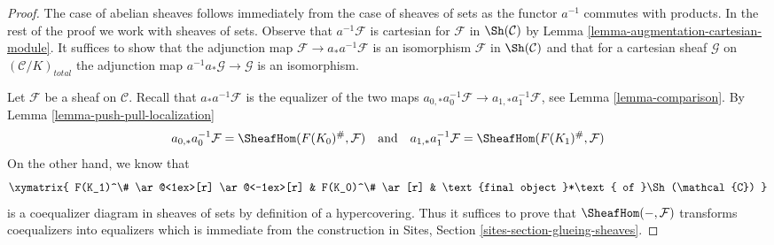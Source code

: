\begin{proof}
The case of abelian sheaves follows immediately from the case
of sheaves of sets as the functor $a^{-1}$ commutes with products.
In the rest of the proof we work with sheaves of sets.
Observe that $a^{-1}\mathcal{F}$ is cartesian for
$\mathcal{F}$ in $\Sh(\mathcal{C})$ by
Lemma \ref{lemma-augmentation-cartesian-module}.
It suffices to show that the adjunction map
$\mathcal{F} \to a_*a^{-1}\mathcal{F}$
is an isomorphism $\mathcal{F}$ in $\Sh(\mathcal{C})$
and that for a cartesian sheaf
$\mathcal{G}$ on $(\mathcal{C}/K)_{total}$
the adjunction map
$a^{-1}a_*\mathcal{G} \to \mathcal{G}$ is an isomorphism.

\medskip\noindent
Let $\mathcal{F}$ be a sheaf on $\mathcal{C}$.
Recall that $a_*a^{-1}\mathcal{F}$ is the equalizer
of the two maps $a_{0, *}a_0^{-1}\mathcal{F} \to a_{1, *}a_1^{-1}\mathcal{F}$,
see Lemma \ref{lemma-comparison}.
By Lemma \ref{lemma-push-pull-localization}
$$
a_{0, *}a_0^{-1}\mathcal{F} = \SheafHom(F(K_0)^\#, \mathcal{F})
\quad\text{and}\quad
a_{1, *}a_1^{-1}\mathcal{F} = \SheafHom(F(K_1)^\#, \mathcal{F})
$$
On the other hand, we know that
$$
\xymatrix{
F(K_1)^\# \ar@<1ex>[r] \ar@<-1ex>[r] &
F(K_0)^\# \ar[r] & \text{final object }*\text{ of }\Sh(\mathcal{C})
}
$$
is a coequalizer diagram in sheaves of sets by definition of
a hypercovering. Thus it suffices to prove
that $\SheafHom(-, \mathcal{F})$ transforms coequalizers
into equalizers which is immediate from the construction
in Sites, Section \ref{sites-section-glueing-sheaves}.


\end{proof}
